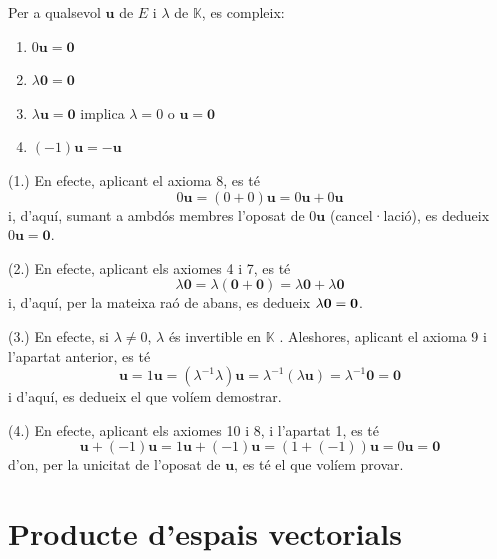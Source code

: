 \begin{teorema}
Per a qualsevol $\mathbf{u}$ de $E$ i $\lambda $ de $\mathbb{K}$, es
compleix:

\begin{enumerate}
\item $0\mathbf{u}=\mathbf{0}$

\item $\lambda \mathbf{0}=\mathbf{0}$

\item $\lambda \mathbf{u}=\mathbf{0}$ implica $\lambda =0$ o $\mathbf{u}=%
\mathbf{0}$

\item $(-1)\mathbf{u}=-\mathbf{u}$
\end{enumerate}

\end{teorema}
\begin{prova}
\bigskip (1.) En efecte, aplicant el axioma 8, es té%
\begin{equation*}
0\mathbf{u}=(0+0)\mathbf{u}=0\mathbf{u}+0\mathbf{u}
\end{equation*}%
i, d’aquí, sumant a ambdós membres l'oposat de $0\mathbf{u}$
(cancel·lació), es dedueix $0\mathbf{u}=\mathbf{0}$.

(2.) En efecte, aplicant els axiomes 4 i 7, es té%
\begin{equation*}
\lambda \mathbf{0}=\lambda (\mathbf{0}+\mathbf{0})=\lambda \mathbf{0}%
+\lambda \mathbf{0}
\end{equation*}%
i, d’aquí, per la mateixa raó de abans, es dedueix $\lambda \mathbf{%
0}=\mathbf{0}$.

(3.) En efecte, si $\lambda \neq 0$, $\lambda $ és invertible en $\mathbb{K}$%
. Aleshores, aplicant el axioma 9 i l’apartat anterior, es té%
\begin{equation*}
\mathbf{u}=1\mathbf{u}=(\lambda ^{-1}\lambda )\mathbf{u}=\lambda
^{-1}(\lambda \mathbf{u})=\lambda ^{-1}\mathbf{0}=\mathbf{0}
\end{equation*}%
i d’aquí, es dedueix el que volíem demostrar.

(4.) En efecte, aplicant els axiomes 10 i 8, i l’apartat 1, es té 
\begin{equation*}
\mathbf{u}+(-1)\mathbf{u}=1\mathbf{u}+(-1)\mathbf{u}=(1+(-1))\mathbf{u}=0%
\mathbf{u}=\mathbf{0}
\end{equation*}%
d’on, per la unicitat de l’oposat de $\mathbf{u}$, es té el que volíem provar.
\end{prova}

\section{Producte d’espais vectorials}

